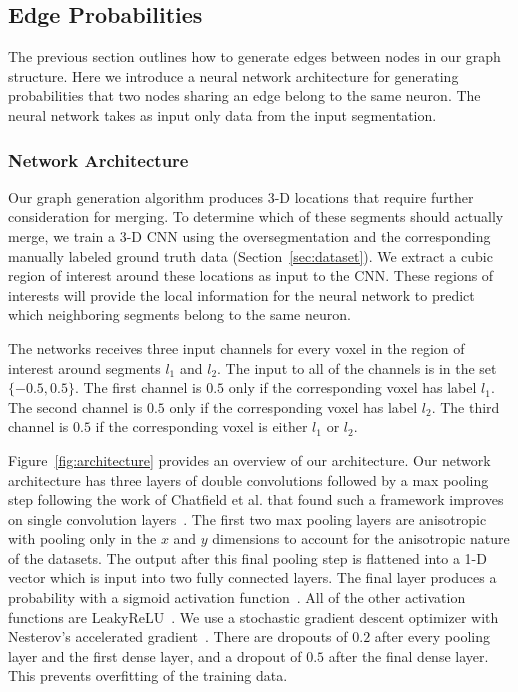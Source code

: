 \subsection{Edge Probabilities}

The previous section outlines how to generate edges between nodes in our graph structure. 
Here we introduce a neural network architecture for generating probabilities that two nodes sharing an edge belong to the same neuron. 
The neural network takes as input only data from the input segmentation. 

\subsubsection{Network Architecture}

Our graph generation algorithm produces 3-D locations that require further consideration for merging. 
To determine which of these segments should actually merge, we train a 3-D CNN using the oversegmentation and the corresponding manually labeled ground truth data (Section~\ref{sec:dataset}).
We extract a cubic region of interest around these locations as input to the CNN. 
These regions of interests will provide the local information for the neural network to predict which neighboring segments belong to the same neuron. 

The networks receives three input channels for every voxel in the region of interest around segments $l_1$ and $l_2$. 
The input to all of the channels is in the set $\{-0.5, 0.5\}$. 
The first channel is $0.5$ only if the corresponding voxel has label $l_1$. 
The second channel is $0.5$ only if the corresponding voxel has label $l_2$. 
The third channel is $0.5$ if the corresponding voxel is either $l_1$ or $l_2$. 

Figure~\ref{fig:architecture} provides an overview of our architecture. 
Our network architecture has three layers of double convolutions followed by a max pooling step following the work of Chatfield et al. that found such a framework improves on single convolution layers~\cite{chatfield2014return}. The first two max pooling layers are anisotropic with pooling only in the $x$ and $y$ dimensions to account for the anisotropic nature of the datasets.
The output after this final pooling step is flattened into a 1-D vector which is input into two fully connected layers.
The final layer produces a probability with a sigmoid activation function~\cite{funahashi1989approximate}. 
All of the other activation functions are LeakyReLU~\cite{maas2013rectifier}. 
We use a stochastic gradient descent optimizer with Nesterov's accelerated gradient~\cite{nesterov1983method}. 
There are dropouts of $0.2$ after every pooling layer and the first dense layer, and a dropout of $0.5$ after the final dense layer. 
This prevents overfitting of the training data.


